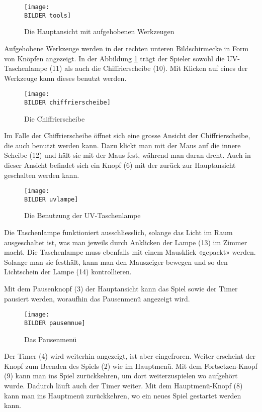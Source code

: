 \begin{figure}[h!]
	\centering
		\texttt{[image: \\BILDER tools]}
 	\caption{Die Hauptansicht mit aufgehobenen Werkzeugen}
  \label{fig:werkzeuge}
\end{figure}

Aufgehobene Werkzeuge werden in der rechten unteren Bildschirmecke in Form von Knöpfen angezeigt. In der Abbildung \ref{fig:werkzeuge} trägt der Spieler sowohl die UV-Taschenlampe (11) als auch die Chiffrierscheibe (10). Mit Klicken auf eines der Werkzeuge kann dieses benutzt werden.

\begin{figure}[h!]
	\centering
		\texttt{[image: \\BILDER chiffrierscheibe]}
 	\caption{Die Chiffrierscheibe}
  \label{fig:chiffrierscheibe}
\end{figure}

Im Falle der Chiffrierscheibe öffnet sich eine grosse Ansicht der Chiffrierscheibe, die auch benutzt werden kann. Dazu klickt man mit der Maus auf die innere Scheibe (12) und hält sie mit der Maus fest, während man daran dreht. Auch in dieser Ansicht befindet sich ein Knopf (6) mit der zurück zur Hauptansicht geschalten werden kann.

\begin{figure}[h!]
	\centering
		\texttt{[image: \\BILDER uvlampe]}
 	\caption{Die Benutzung der UV-Taschenlampe}
  \label{fig:uvlampe}
\end{figure}

Die Taschenlampe funktioniert ausschliesslich, solange das Licht im Raum ausgeschaltet ist, was man jeweils durch Anklicken der Lampe (13) im Zimmer macht. Die Taschenlampe muss ebenfalls mit einem Mausklick «gepackt» werden. Solange man sie festhält, kann man den Mauszeiger bewegen und so den Lichtschein der Lampe (14) kontrollieren. 

Mit dem Pausenknopf (3) der Hauptansicht kann das Spiel sowie der Timer pausiert werden, woraufhin das Pausenmenü angezeigt wird.

\begin{figure}[htbp]
	\centering
		\texttt{[image: \\BILDER pausemnue]}
 	\caption{Das Pausenmenü}
  \label{fig:pausemenu}
\end{figure}

Der Timer (4) wird weiterhin angezeigt, ist aber eingefroren. Weiter erscheint der Knopf zum Beenden des Spiels (2) wie im Hauptmenü. Mit dem Fortsetzen-Knopf (9) kann man ins Spiel zurückkehren, um dort weiterzuspielen wo aufgehört wurde. Dadurch läuft auch der Timer weiter. Mit dem Hauptmenü-Knopf (8) kann man ins Hauptmenü zurückkehren, wo ein neues Spiel gestartet werden kann.

